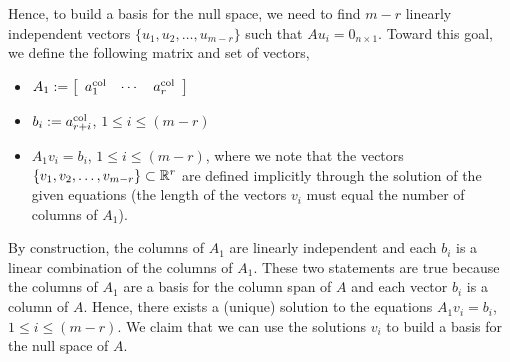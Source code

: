 Hence, to build a basis for the null space, we need to find $m-r$ linearly independent vectors $\{u_1, u_2, \ldots,  u_{m-r}\}$ such that $A u_i = 0_{n \times 1}.$ Toward this goal, we define the following matrix and set of vectors, 
\begin{itemize}
    \item $A_1:=\left[ \begin{array}{ccc} a_1^{\rm col} & \cdots & a_r^{\rm col} \end{array} \right]$
    \item $b_i:= a_{r+i}^{\rm col}$, $1 \le i \le (m-r)$
    \item $A_1 v_i = b_i$, $1 \le i \le (m-r)$, where we note that the vectors $\{v_1, v_2, \ldots, v_{m-r} \} \subset \mathbb R^r$ are defined implicitly through the solution of the given equations (the length of the vectors $v_i$ must equal the number of columns of $A_1$). 
\end{itemize}
\vspace*{.1cm}

By construction, the columns of $A_1$ are linearly independent and each $b_i$ is a linear combination of the columns of $A_1$. These two statements are true because the columns of $A_1$ are a basis for the column span of $A$ and each vector $b_i$ is a column of $A$. Hence, there exists a (unique) solution to the equations $A_1 v_i = b_i$, $1 \le i \le (m-r)$. We claim that we can use the solutions $v_i$ to build a basis for the null space of $A$.\\

